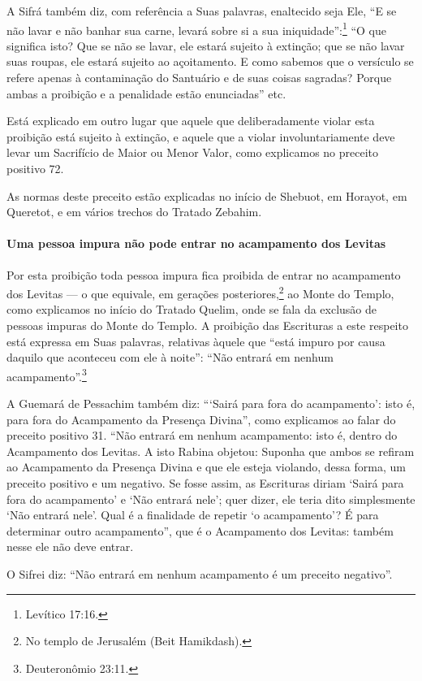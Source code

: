 A Sifrá também diz, com referência a Suas palavras, enaltecido seja Ele,
``E se não lavar e não banhar sua carne, levará sobre si a sua
iniquidade'':\footnote{Levítico 17:16.} ``O que significa isto? Que se não se
lavar, ele estará sujeito à extinção; que se não lavar suas roupas, ele
estará sujeito ao açoitamento. E como sabemos que o versículo se refere
apenas à contaminação do Santuário e de suas coisas sagradas? Porque
ambas a proibição e a penalidade estão enunciadas'' etc.

Está explicado em outro lugar que aquele que deliberadamente violar
esta proibição está sujeito à extinção, e aquele que a violar
involuntariamente deve levar um Sacrifício de Maior ou Menor Valor,
como explicamos no preceito positivo 72.

As normas deste preceito estão explicadas no início de Shebuot, em
Horayot, em Queretot, e em vários trechos do Tratado Zebahim.

\paragraph{Uma pessoa impura não pode entrar no acampamento dos Levitas}

Por esta proibição toda pessoa impura fica proibida de entrar no
acampamento dos Levitas --- o que equivale, em gerações
posteriores,\footnote{No templo de Jerusalém (Beit Hamikdash).} ao Monte do Templo, como explicamos
no início do Tratado Quelim, onde se fala da exclusão de pessoas
impuras do Monte do Templo. A proibição das Escrituras a este respeito
está expressa em Suas palavras, relativas àquele que ``está impuro por
causa daquilo que aconteceu com ele à noite'': ``Não entrará em nenhum
acampamento''.\footnote{Deuteronômio 23:11.}

A Guemará de Pessachim também diz: ```Sairá para fora do acampamento':
isto é, para fora do Acampamento da Presença Divina'', como explicamos
ao falar do preceito positivo 31. ``Não entrará em nenhum acampamento:
isto é, dentro do Acampamento dos Levitas. A isto Rabina objetou:
Suponha que ambos se refiram ao Acampamento da Presença Divina e que
ele esteja violando, dessa forma, um preceito positivo e um negativo. Se
fosse assim, as Escrituras diriam `Sairá para fora do acampamento' e
`Não entrará nele'; quer dizer, ele teria dito simplesmente `Não entrará
nele'. Qual é a finalidade de repetir `o acampamento'? É para
determinar outro acampamento'', que é o Acampamento dos Levitas: também
nesse ele não deve entrar.

O Sifrei diz: ``Não entrará em nenhum acampamento é um preceito
negativo''.

